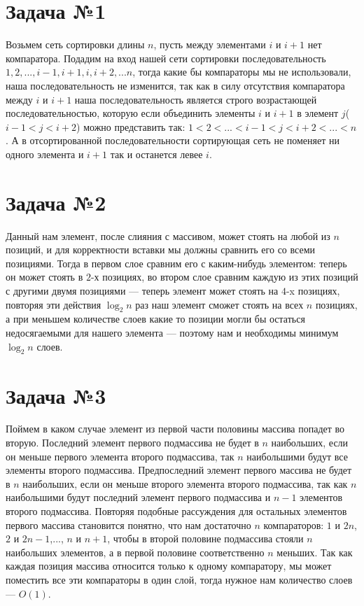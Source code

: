 \documentclass{article}
\begin{document}
 
\noindent 
\large 
\onehalfspacing 
\section{Задача №1}
Возьмем сеть сортировки длины $n$, пусть между элементами $i$ и $i+1$ нет компаратора. Подадим на вход нашей сети сортировки последовательность $1,2,...,i-1,i+1,i,i+2,...n$, тогда какие бы компараторы мы не использовали, наша последовательность не изменится, так как в силу отсутствия компаратора между $i$ и $i+1$ наша последовательность является строго возрастающей последовательностью, которую если объединить элементы $i$ и $i+1$ в элемент $j$($i-1<j<i+2$) можно представить так: $1<2<...<i-1<j<i+2<...<n$. А в отсортированной последовательности сортирующая сеть не поменяет ни одного элемента и $i+1$ так и останется левее $i$.
\section{Задача №2}
Данный нам элемент, после слияния с массивом, может стоять на любой из $n$ позиций, и для корректности вставки мы должны сравнить его со всеми позициями. Тогда в первом слое сравним его с каким-нибудь элементом: теперь он может стоять в $2$-х позициях, во втором слое сравним каждую из этих позиций с другими двумя позициями --- теперь элемент может стоять на $4$-x позициях, повторяя эти действия $\log_2{n}$ раз наш элемент сможет стоять на всех $n$ позициях, а при меньшем количестве слоев какие то позиции могли бы остаться недосягаемыми для нашего элемента --- поэтому нам и необходимы минимум $\log_2{n}$ слоев.
\section{Задача №3}
Поймем в каком случае элемент из первой части половины массива попадет во вторую. Последний элемент первого подмассива не будет в $n$ наибольших, если он меньше первого элемента второго подмассива, так $n$ наибольшими будут все элементы второго подмассива. Предпоследний элемент первого массива не будет в $n$ наибольших, если он меньше  второго элемента второго подмассива, так как $n$ наибольшими будут последний элемент первого подмассива и $n-1$ элементов второго подмассива. Повторяя подобные рассуждения для остальных элементов первого массива становится понятно, что нам достаточно $n$ компараторов: $1$ и $2n$, $2$ и $2n-1$,..., $n$ и $n+1$, чтобы в второй половине подмассива стояли $n$ наибольших элементов, а в первой половине соответственно $n$ меньших. Так как каждая позиция массива относится только к одному компаратору, мы может поместить все эти компараторы в один слой, тогда нужное нам количество слоев --- $O(1)$.
\end{document}
